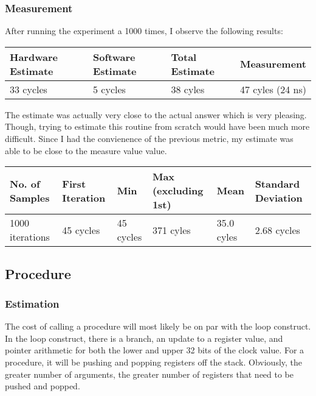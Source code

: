 \documentclass[paper=a4, fontsize=11pt]{scrartcl}
\numberwithin{equation}{section}        %
\numberwithin{figure}{section}          %
\numberwithin{table}{section}               %
\begin{document}
\subsubsection{Measurement}

After running the experiment a 1000 times, I observe the following results:

\begin{center}
    \begin{tabular}{ | l | l | l | p{5cm} |}
    \hline
    Hardware Estimate & Software Estimate & Total Estimate & Measurement \\ \hline
    33 cycles & 5 cycles & 38 cyles & 47 cyles (24 ns) \\ 
    \hline
    \end{tabular}
\end{center}

The estimate was actually very close to the actual answer which is very pleasing.  Though, trying to estimate this routine from scratch would have been much more difficult.  Since I had the convienence of the previous metric, my estimate was able to be close to the measure value value.

\begin{center}
    \begin{tabular}{ | l | l | l | l | l | l |}
    \hline
    No. of Samples & First Iteration & Min & Max (excluding 1st) & Mean & Standard Deviation \\ \hline
    1000 iterations & 45 cycles & 45 cycles & 371 cyles & 35.0 cyles & 2.68 cycles \\ 
    \hline
    \end{tabular}
\end{center}

\subsection{Procedure}

\subsubsection{Estimation}

The cost of calling a procedure will most likely be on par with the loop construct.  In the loop construct, there is a branch, an update to a register value, and pointer arithmetic for both the lower and upper 32 bits of the clock value.  For a procedure, it will be pushing and popping registers off the stack.  Obviously, the greater number of arguments, the greater number of registers that need to be pushed and popped.
\end{document}

